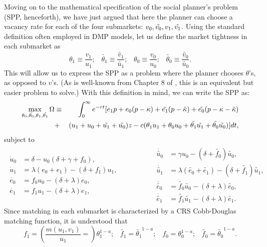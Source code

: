 \documentclass[12pt]{article} %
\theoremstyle{definition}
\begin{document}
Moving on to the mathematical specification of the social planner's problem (SPP, henceforth), we have just argued that here the planner can choose a vacancy rate for each of the four submarkets: $v_0, \Tilde{v_0}, v_1, \Tilde{v_1}$. Using the standard definition often employed in DMP models, let us define the market tightness in each submarket as
\begin{equation*}
\theta_1\equiv \frac{v_1}{u_1};\,\,\,\,\, \tilde{\theta_1}\equiv \frac{\tilde{v_1}}{\tilde{u_1}}; \,\,\,\,\, \theta_0\equiv \frac{v_0}{u_0};\,\,\,\,\, \tilde{\theta_0}\equiv \frac{\tilde{v_0}}{\tilde{u_0}}.\label{eq market tightness}
\end{equation*}This will allow us to express the SPP as a problem where the planner chooses $\theta$'s, as opposed to $v$'s. (As is well-known from Chapter 8 of \cite{pissarides2000equilibrium}, this is an equivalent but easier problem to solve.) With this definition in mind, we can write the SPP as:
\begin{eqnarray*}
\max_{\theta_0,\tilde{\theta_0},\theta_1,\tilde{\theta_1}} \Omega &\equiv&\int_0^{\infty} e^{-rt}[ e_1 p + e_0 (p-\kappa) + \tilde{e_1}(p-\tilde{\kappa}) 
+ \tilde{e_0}(p-\kappa-\tilde{\kappa}) \nonumber \\
&+& (u_1+u_0+\tilde{u_1}+\tilde{u_0})z-c(\theta_1 u_1+\theta_0 u_0+\tilde{\theta_1}\tilde{u_1}+\tilde{\theta_0}\tilde{u_0})]dt,  
\vspace{-3mm}
\end{eqnarray*}
subject to 
\vspace{-2mm}
\begin{eqnarray*} 
\begin{split}
\dot{u}_0 &=\delta -u_0(\delta +\gamma +f_0),\\ 
\dot{u}_1 &= \lambda (e_0+e_1) - (\delta + f_1)u_1,\\
\dot{e_0}&= f_0 u_0 -(\delta+\lambda) e_0, \\
\dot{e_1}&= f_1 u_1 -(\delta+\lambda) e_1, 
\end{split}
\hspace{2cm}
\begin{split}
\dot{\tilde{u_0}} &= \gamma u_0 - (\delta  +\tilde{f_0})\tilde{u_0},\\ 
\dot{\tilde{u_1}} &= \lambda (\tilde{e_0}+\tilde{e_1}) - (\delta + \tilde{f_1})\tilde{u_1},\\   
\dot{\tilde{e_0}} &= \tilde{f_0} \tilde{u_0} -(\delta+\lambda) \tilde{e_0},\\
\dot{\tilde{e_1}} &= \tilde{f_1} \tilde{u_1} -(\delta+\lambda) \tilde{e_1}. 
\end{split}
\end{eqnarray*}Since matching in each submarket is characterized by a CRS Cobb-Douglas matching function, it is understood that 
\begin{equation*}
f_1=\left(\frac{m(u_1,v_1)}{u_1}=\right)\theta_1^{1-a};\,\,\,\,\, \tilde{f_1}=
\tilde{\theta_1}^{1-a}; \,\,\,\,\, f_0=
\theta_0^{1-a};\,\,\,\,\, \tilde{f_0}=
\tilde{\theta_0}^{1-a}.
\end{equation*}
\end{document}
